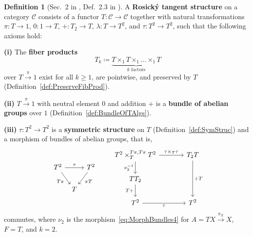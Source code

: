 \documentclass[12pt,reqno, a4paper]{amsart}
\numberwithin{equation}{section}
\theoremstyle{plain}
\theoremstyle{definition}
\newtheorem{Definition}[Theorem]{Definition}
\theoremstyle{remark}
\newcommand{\calC}{\mathcal{C}}
\newcommand{\Id}{\mathrm{1}}
\begin{document}
\begin{Definition}[Sec.~2 in \cite{Rosicky:1984}, Def.~2.3 in \cite{CockettCruttwell:2014}]
\label{def:TangentStructure}
A \textbf{Rosick\'y tangent structure} on a category $\calC$ consists of a functor $T: \calC \to \calC$ together with natural transformations $\pi: T \to \Id$, $0: \Id \to T$, $+: T_2 \to T$, $\lambda: T \to T^2$, and $\tau: T^2 \to T^2$, such that the following axioms hold:

\textbf{(i)} The \textbf{fiber products}
\begin{equation}
\label{eq:TanFun1}
  T_k \coloneqq \underbrace{T \times_\Id T \times_\Id \ldots \times_\Id T}_{k \text{ factors}}
\end{equation}
over $T \stackrel{\pi}{\to} \Id$ exist for all $k \geq 1$, are pointwise, and preserved by $T$ (Definition~\ref{def:PreserveFibProd}).

\textbf{(ii)} $T \stackrel{\pi}{\to} \Id$ with neutral element $0$ and addition $+$ is a \textbf{bundle of abelian groups} over $\Id$ (Definition~\ref{def:BundleOfTAlgs}).

\textbf{(iii)}
$\tau: T^2 \to T^2$ is a \textbf{symmetric structure} on $T$ (Definition~\ref{def:SymStruc}) and a morphism of bundles of abelian groups, that is,
\begin{equation}
\label{eq:TanFun2}
\begin{tikzcd}[column sep=tiny]
T^2 \ar[rr, "\tau"] \ar[dr, "T \pi"'] && T^2 \ar[dl, "\pi T"]
\\
& T &
\end{tikzcd}
\qquad
\begin{tikzcd}[column sep=large]
T^2 \times_T^{T\pi, T\pi} T^2
\ar[r, "\tau \times_T \tau"]
\ar[d, "\nu_2^{-1}"']
&
T_2 T
\ar[dd, "+T"]
\\
T T_2  \ar[d, "T+"']
&
\\
T^2 \ar[r, "\tau"']
&
T^2
\end{tikzcd}
\end{equation}
commutes, where $\nu_2$ is the morphism~\eqref{eq:MorphBundles4} for $A=TX \xrightarrow{\pi_X} X$, $F=T$, and $k=2$.





\end{Definition}
\end{document}
